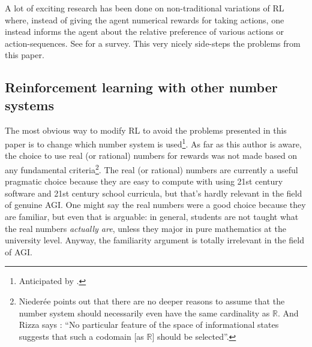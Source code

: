 \documentclass[reqno]{article}
\theoremstyle{definition}
\begin{document}
A lot of exciting research has been done on non-traditional variations
of RL where, instead of giving the agent numerical rewards for taking actions,
one instead informs the agent about the relative preference of various
actions or action-sequences. See \cite{wirth2017survey} for a survey.
This very nicely side-steps the problems from this paper.


\subsection{Reinforcement learning with other number systems}

The most obvious way to modify RL to avoid the problems presented in this
paper is to change which number system is used\footnote{Anticipated
by \cite{rizza2016divergent}.}.
As far as this author is aware,
the choice to use real (or rational) numbers for rewards was not made based
on any fundamental criteria\footnote{Nieder{\'e}e points out
\cite{niederee1992numbers} that there are
no deeper reasons to assume that the number system should necessarily
even have the same cardinality as $\mathbb R$. And Rizza says
\cite{rizza2016divergent}: ``No particular feature of the space of informational
states suggests that such a codomain [as $\mathbb R$] should be selected''.}. The real
(or rational) numbers are currently a
useful pragmatic choice because they are easy to compute with using 21st
century software and 21st century school curricula, but that's hardly relevant
in the field of genuine AGI. One might
say the real numbers were a good choice because they are familiar, but even
that is arguable: in general, students are not taught what the
real numbers \emph{actually are},
unless they major in pure mathematics at the university level. Anyway,
the familiarity argument is totally irrelevant in the field of AGI.
\end{document}

